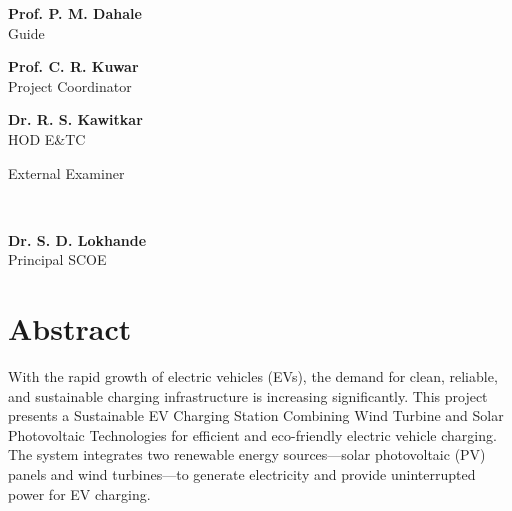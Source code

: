 \documentclass[12pt]{report}
\begin{document}
\begin{Certificatepage}
\begin{center}
\begin{justify}
\noindent
\noindent
\begin{minipage}[t]{0.33\textwidth}
\centering
\textbf{Prof. P. M. Dahale}\\
Guide
\end{minipage}\hfill
\begin{minipage}[t]{0.33\textwidth}
\centering
\textbf{Prof. C. R. Kuwar}\\
Project Coordinator

\end{minipage}\hfill
\begin{minipage}[t]{0.33\textwidth}
\centering
\textbf{Dr. R. S. Kawitkar}\\
HOD E\&TC
\end{minipage}
 
\vspace{25mm} 

\noindent
\begin{minipage}[t]{0.33\textwidth}
\centering
External Examiner
\end{minipage}\hfill
\begin{minipage}[t]{0.33\textwidth}
\centering
\textbf{}\\

\end{minipage}\hfill
\begin{minipage}[t]{0.33\textwidth}
\centering
\textbf{Dr. S. D. Lokhande}\\
Principal SCOE
\end{minipage}

\tableofcontents
\newpage

\listoffigures
{}
 
\newpage

\chapter*{Abstract}

    
With the rapid growth of electric vehicles (EVs), the demand for clean, reliable, and sustainable charging infrastructure is increasing significantly. This project presents a Sustainable EV Charging Station Combining Wind Turbine and Solar Photovoltaic Technologies for efficient and eco-friendly electric vehicle charging. The system integrates two renewable energy sources—solar photovoltaic (PV) panels and wind turbines—to generate electricity and provide uninterrupted power for EV charging. \vspace{0.5cm} %


\end{justify}
\end{center}
\end{Certificatepage}
\end{document}
